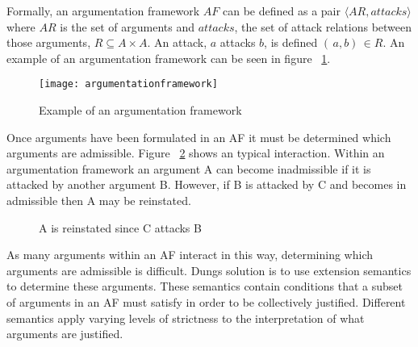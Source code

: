 Formally, an argumentation framework $AF$ can be defined as a pair $\langle AR,attacks \rangle$ where $AR$ is the set of arguments and $attacks$, the set of attack relations between those arguments, $R \subseteq A \times A$. An attack, $a$ attacks $b$, is defined $ ( \, a , b ) \, \in R$. An example of an argumentation framework can be seen in figure ~\ref{fig:argframework}.

\begin{figure}[h]
\caption{Example of an argumentation framework}
\centering
\texttt{[image: argumentationframework]}
\label{fig:argframework}
\end{figure}

Once arguments have been formulated in an AF it must be determined which arguments are admissible. Figure ~\ref{fig:arginteration} shows an typical interaction. Within an argumentation framework an argument A can become inadmissible if it is attacked by another argument B. However, if B is attacked by C and becomes in admissible then A may be reinstated.

\begin{figure}[!h]
\centering
{}
\caption{A is reinstated since C attacks B}
\label{fig:arginteration}
\end{figure}

As many arguments within an AF interact in this way, determining which arguments are admissible is difficult. Dungs solution is to use extension semantics to determine these arguments. These semantics contain conditions that a subset of arguments in an AF must satisfy in order to be collectively justified. Different semantics apply varying levels of strictness to the interpretation of what arguments are justified.

